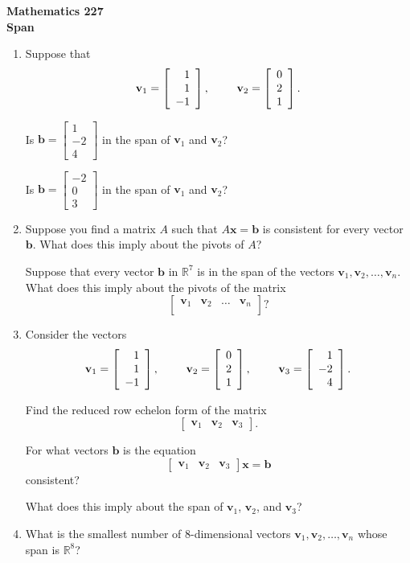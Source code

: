 \documentclass[12pt]{article}
\newcommand{\vs}[1]{\vspace{#1in}}
\newcommand{\bvec}{{\mathbf b}}
\newcommand{\vvec}{{\mathbf v}}
\newcommand{\xvec}{{\mathbf x}}
\newcommand{\real}{{\mathbb R}}
\newcommand{\threevec}[3]{\left[\begin{array}{r}#1 \\ #2 \\ #3
  \end{array}\right]}
\begin{document}
\noindent
{\bf Mathematics 227} \\ 
{\bf Span}

\bigskip
\begin{enumerate}
\item Suppose that
  $$
  \vvec_1 = \threevec11{-1}, \hspace*{24pt}
  \vvec_2 = \threevec021.
  $$

  Is $\bvec = \threevec1{-2}4$ in the span of $\vvec_1$ and $\vvec_2$?

  \vs{1}
  Is $\bvec = \threevec{-2}03$ in the span of $\vvec_1$ and $\vvec_2$?
  
  \vs{1}
\item Suppose you find a matrix $A$ such that $A\xvec = \bvec$ is
  consistent for every vector $\bvec$.  What does this imply about the
  pivots of $A$? 

  \vs{1}
  Suppose that every vector $\bvec$ in $\real^7$ is in the span of the
  vectors $\vvec_1, \vvec_2, \ldots, \vvec_n$.  What does this imply
  about the pivots of the matrix
  $$
  \left[
    \begin{array}{cccc}
      \vvec_1 & \vvec_2 & \ldots & \vvec_n \\
    \end{array}
  \right]?
  $$

  \vs{1}

\item  Consider the vectors
  $$
  \vvec_1=\threevec11{-1},\hspace*{24pt}
  \vvec_2=\threevec021,\hspace*{24pt}
  \vvec_3=\threevec1{-2}4.
  $$

  Find the reduced row echelon form of the matrix
  $$
  \left[
    \begin{array}{ccc}
      \vvec_1 & \vvec_2 & \vvec_3
    \end{array}
  \right].
  $$

  \vs{1}
  For what vectors $\bvec$ is the equation
  $$
  \left[
    \begin{array}{ccc}
      \vvec_1 & \vvec_2 & \vvec_3
    \end{array}
  \right]
  \xvec=\bvec
  $$
  consistent?

  \vs{1}

  What does this imply about the span of $\vvec_1$, $\vvec_2$, and
  $\vvec_3$?

  \vs{1}
\item  What is the smallest number of 8-dimensional vectors $\vvec_1,
  \vvec_2,\ldots,\vvec_n$ whose span is $\real^8$?
  
  

  


                                          


  

\end{enumerate}
\end{document}
